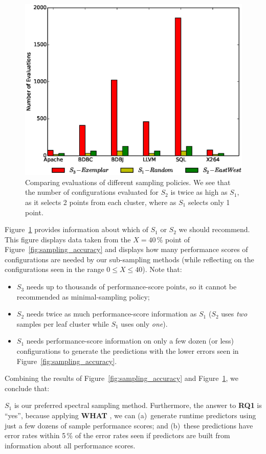 \documentclass{newsig}
\newcommand{\fig}[1]{Figure~\ref{fig:#1}}
\newcommand{\what}{{\bf WHAT }}
\begin{document}
\begin{figure}[tbh]
\centering
\includegraphics[width=0.9\columnwidth]{Figures/evaluation_graph}
\caption{Comparing evaluations of different sampling policies. We see that the number of configurations evaluated for $S_2$ is twice as high as $S_1$, as it selects 2 points from each cluster, where as  $S_1$ selects only 1 point. }\label{fig:Evaluations}
\end{figure}

\fig{Evaluations} provides information about which  of    $S_1$ or $S_2$ we should recommend.
This figure displays data taken from the $X=40$\,\% point of \fig{sampling_accuracy} and displays
how many performance scores of configurations are needed by our sub-sampling methods (while
reflecting on the configurations seen in the range $0\le X \le 40$). Note that:
\begin{itemize}
\item
$S_3$ needs up to thousands of performance-score points, 
so it cannot be recommended as minimal-sampling policy;
\item $S_2$ needs twice as much performance-score information as 
$S_1$ ($S_2$ uses {\em two} samples per leaf cluster  while
$S_1$ uses only {\em one}).
\item $S_1$ needs performance-score information on only a few dozen (or less) configurations to generate
the predictions with the lower errors seen in \fig{sampling_accuracy}.
\end{itemize}
Combining the results of \fig{sampling_accuracy} and \fig{Evaluations}, we conclude that:

\begin{myshadowbox}
$S_1$ is our preferred spectral sampling method. Furthermore,
the answer to {\bf RQ1} is ``yes'', because applying \what{}, we can (a)~generate runtime predictors
using just a few dozens of sample performance scores; 
and (b)~these predictions have error rates
within 5\,\% of the error rates seen if predictors are built from information about all performance scores.
\end{myshadowbox}
\end{document}
